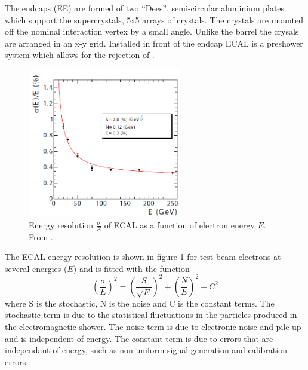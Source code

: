 The endcaps (EE) are formed of two ``Dees'', semi-circular aluminium plates
which support the supercrystals, 5x5 arrays of crystals. The crystals are
mounted off the nominal interaction vertex by a small angle. Unlike the barrel
the crysals are arranged in an x-y grid.
Installed in front of the endcap ECAL is a preshower system which allows for
the rejection of \Ppizero .\cite{cms}

\begin{figure}[htb!]
  \centering
  \includegraphics[width=0.6\textwidth]{ECAL}
  \caption{Energy resolution $\frac{\sigma}{E}$ of ECAL as a function of
  \label{fig:ECAL}
electron energy $E$. From \cite{cms}.}
\end{figure}

The ECAL energy resolution is shown in figure \ref{fig:ECAL} for test beam
electrons at several energies ($E$) and is fitted with the function
\begin{equation}
\left(\frac{\sigma}{E}\right)^{2} = \left(\frac{S}{\sqrt{E}}\right)^{2} +
\left(\frac{N}{E}\right)^{2} + C^{2}
\end{equation}
where S is the stochastic, N is the noise and C is the constant terms. The
stochastic term is due to the statistical fluctuations in the particles
produced in the electromagnetic shower. The noise term is due to electronic
noise and pile-up and is independent of energy. The constant term is due to
errors that are independant of energy, such as non-uniform signal generation
and calibration errors.\cite{cms}




